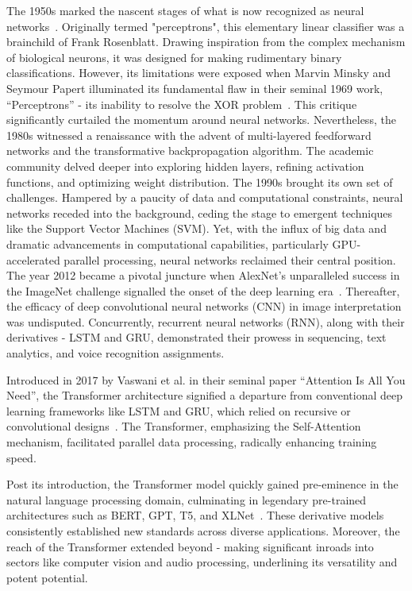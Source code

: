 \documentclass[10pt,twocolumn,letterpaper]{article}
\begin{document}
The 1950s marked the nascent stages of what is now recognized as neural networks~\cite{Lecun98}. Originally termed "perceptrons", this elementary linear classifier was a brainchild of Frank Rosenblatt. Drawing inspiration from the complex mechanism of biological neurons, it was designed for making rudimentary binary classifications. However, its limitations were exposed when Marvin Minsky and Seymour Papert illuminated its fundamental flaw in their seminal 1969 work, ``Perceptrons'' - its inability to resolve the XOR problem~\cite{Krizhevsky12,Simonyan14}. This critique significantly curtailed the momentum around neural networks. Nevertheless, the 1980s witnessed a renaissance with the advent of multi-layered feedforward networks and the transformative backpropagation algorithm. The academic community delved deeper into exploring hidden layers, refining activation functions, and optimizing weight distribution. The 1990s brought its own set of challenges. Hampered by a paucity of data and computational constraints, neural networks receded into the background, ceding the stage to emergent techniques like the Support Vector Machines (SVM). Yet, with the influx of big data and dramatic advancements in computational capabilities, particularly GPU-accelerated parallel processing, neural networks reclaimed their central position. The year 2012 became a pivotal juncture when AlexNet's unparalleled success in the ImageNet challenge signalled the onset of the deep learning era~\cite{He16,Szegedy15}. Thereafter, the efficacy of deep convolutional neural networks (CNN) in image interpretation was undisputed. Concurrently, recurrent neural networks (RNN), along with their derivatives - LSTM and GRU, demonstrated their prowess in sequencing, text analytics, and voice recognition assignments.

Introduced in 2017 by Vaswani et al. in their seminal paper ``Attention Is All You Need'', the Transformer architecture signified a departure from conventional deep learning frameworks like LSTM and GRU, which relied on recursive or convolutional designs~\cite{Vaswani17}. The Transformer, emphasizing the Self-Attention mechanism, facilitated parallel data processing, radically enhancing training speed.

Post its introduction, the Transformer model quickly gained pre-eminence in the natural language processing domain, culminating in legendary pre-trained architectures such as BERT, GPT, T5, and XLNet~\cite{Devlin18,Radford18,Radford19}. These derivative models consistently established new standards across diverse applications. Moreover, the reach of the Transformer extended beyond - making significant inroads into sectors like computer vision and audio processing, underlining its versatility and potent potential.
\end{document}
